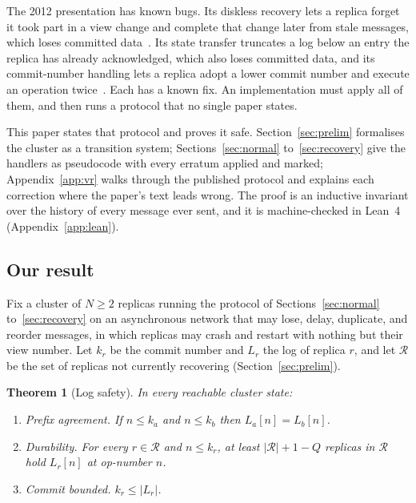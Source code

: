 \documentclass[11pt,a4paper]{article}
\theoremstyle{plain}
\newtheorem{theorem}{Theorem}[section]
\theoremstyle{definition}
\theoremstyle{remark}
\begin{document}
The 2012 presentation has known bugs. Its diskless recovery lets a
replica forget it took part in a view change and complete that change
later from stale messages, which loses committed
data~\citep{michael2017recovery}. Its state transfer truncates a log
below an entry the replica has already acknowledged, which also loses
committed data, and its commit-number handling lets a replica adopt a
lower commit number and execute an operation
twice~\citep{vanlightly2022vr}. Each has a known fix. An implementation
must apply all of them, and then runs a protocol that no single paper
states.

This paper states that protocol and proves it safe. Section~\ref{sec:prelim}
formalises the cluster as a transition system; Sections~\ref{sec:normal}
to~\ref{sec:recovery} give the handlers as pseudocode with every erratum
applied and marked; Appendix~\ref{app:vr} walks through the published
protocol and explains each correction where the paper's text leads
wrong. The proof is an inductive invariant over the history of every
message ever sent, and it is machine-checked in Lean~4
(Appendix~\ref{app:lean}).

\subsection{Our result}

Fix a cluster of $N \ge 2$ replicas running the protocol of
Sections~\ref{sec:normal} to~\ref{sec:recovery} on an asynchronous
network that may lose, delay, duplicate, and reorder messages, in which
replicas may crash and restart with nothing but their view number. Let
$k_r$ be the commit number and $L_r$ the log of replica $r$, and let
$\mathcal{R}$ be the set of replicas not currently recovering
(Section~\ref{sec:prelim}).

\begin{theorem}[Log safety]
\label{thm:log}
In every reachable cluster state:
\begin{enumerate}[nosep,label=(\roman*)]
  \item \emph{Prefix agreement.} If $n \le k_a$ and $n \le k_b$ then
    $L_a[n] = L_b[n]$.
  \item \emph{Durability.} For every $r \in \mathcal{R}$ and
    $n \le k_r$, at least $|\mathcal{R}| + 1 - Q$ replicas in
    $\mathcal{R}$ hold $L_r[n]$ at op-number $n$.
  \item \emph{Commit bounded.} $k_r \le |L_r|$.
\end{enumerate}
\end{theorem}
\end{document}
